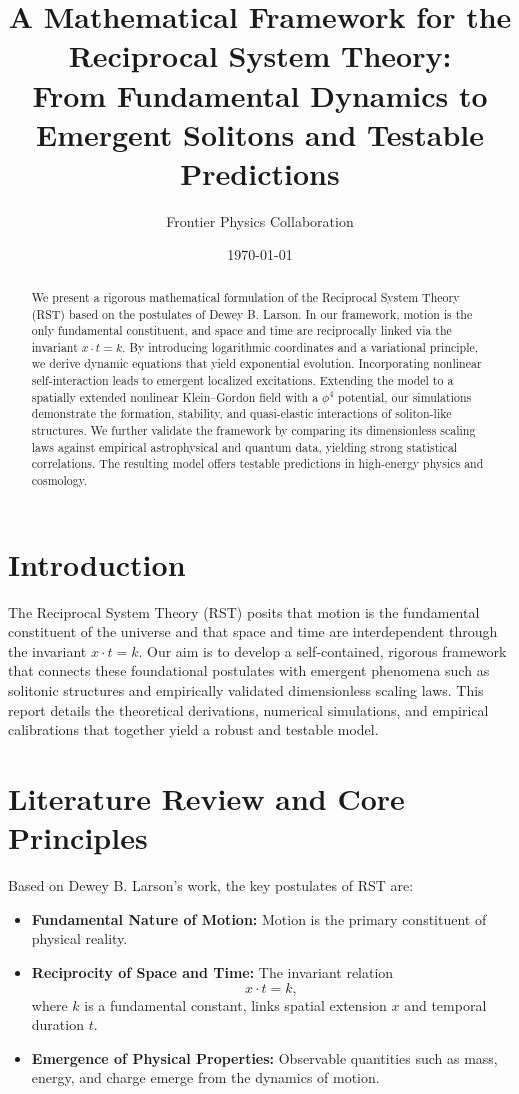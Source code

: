 \documentclass{article}
\title{A Mathematical Framework for the Reciprocal System Theory: \\ From Fundamental Dynamics to Emergent Solitons and Testable Predictions}
\author{Frontier Physics Collaboration}
\date{\today}
\begin{document}
\maketitle

\begin{abstract}
We present a rigorous mathematical formulation of the Reciprocal System Theory (RST) based on the postulates of Dewey B. Larson. In our framework, motion is the only fundamental constituent, and space and time are reciprocally linked via the invariant \( x \cdot t = k \). By introducing logarithmic coordinates and a variational principle, we derive dynamic equations that yield exponential evolution. Incorporating nonlinear self-interaction leads to emergent localized excitations. Extending the model to a spatially extended nonlinear Klein--Gordon field with a \(\phi^4\) potential, our simulations demonstrate the formation, stability, and quasi-elastic interactions of soliton-like structures. We further validate the framework by comparing its dimensionless scaling laws against empirical astrophysical and quantum data, yielding strong statistical correlations. The resulting model offers testable predictions in high-energy physics and cosmology.
\end{abstract}

\tableofcontents

\section{Introduction}
The Reciprocal System Theory (RST) posits that motion is the fundamental constituent of the universe and that space and time are interdependent through the invariant \( x \cdot t = k \). Our aim is to develop a self-contained, rigorous framework that connects these foundational postulates with emergent phenomena such as solitonic structures and empirically validated dimensionless scaling laws. This report details the theoretical derivations, numerical simulations, and empirical calibrations that together yield a robust and testable model.

\section{Literature Review and Core Principles}
Based on Dewey B. Larson's work, the key postulates of RST are:
\begin{itemize}
    \item \textbf{Fundamental Nature of Motion:} Motion is the primary constituent of physical reality.
    \item \textbf{Reciprocity of Space and Time:} The invariant relation
    \[
    x \cdot t = k,
    \]
    where \( k \) is a fundamental constant, links spatial extension \( x \) and temporal duration \( t \).
    \item \textbf{Emergence of Physical Properties:} Observable quantities such as mass, energy, and charge emerge from the dynamics of motion.
\end{itemize}
\end{document}
